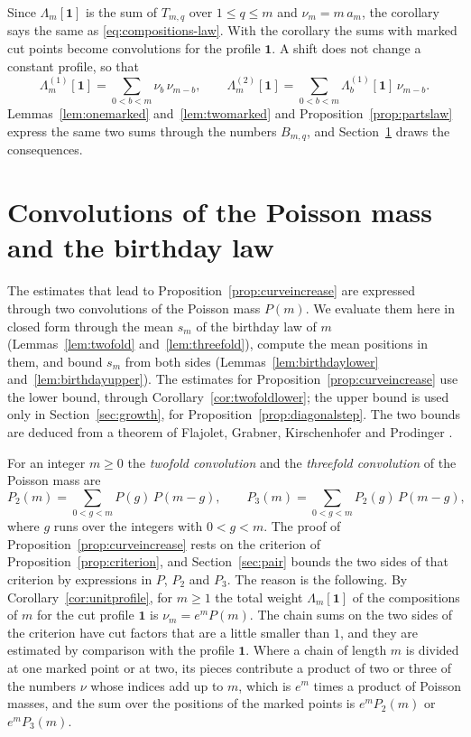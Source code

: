 \documentclass{amsart}
\theoremstyle{definition}
\theoremstyle{remark}
\numberwithin{equation}{section}
\begin{document}
Since $\Lambda_m[\mathbf 1]$ is the sum of $T_{m,q}$ over
$1\le q\le m$ and $\nu_m=m\,a_m$, the corollary says the same as
\eqref{eq:compositions-law}. With the
corollary the sums with marked cut points become convolutions for the
profile $\mathbf 1$. A shift does not change a constant profile, so that
\[
\Lambda^{(1)}_m[\mathbf 1]=\sum_{0<b<m}\nu_b\,\nu_{m-b},\qquad
\Lambda^{(2)}_m[\mathbf 1]=\sum_{0<b<m}\Lambda^{(1)}_b[\mathbf 1]\,\nu_{m-b}.
\]
Lemmas~\ref{lem:onemarked} and~\ref{lem:twomarked} and
Proposition~\ref{prop:partslaw} express the same two sums through the
numbers $B_{m,q}$, and Section~\ref{sec:birthday} draws the consequences.

\section{Convolutions of the Poisson mass and the birthday law}\label{sec:birthday}
The estimates that lead to Proposition~\ref{prop:curveincrease} are
expressed through two convolutions of the Poisson mass $P(m)$. We evaluate
them here in closed form through the mean $s_m$ of the birthday law of $m$
(Lemmas~\ref{lem:twofold} and~\ref{lem:threefold}), compute the mean
positions in them, and bound $s_m$ from both sides
(Lemmas~\ref{lem:birthdaylower} and~\ref{lem:birthdayupper}). The
estimates for Proposition~\ref{prop:curveincrease} use the lower bound,
through Corollary~\ref{cor:twofoldlower}; the upper bound is used only in
Section~\ref{sec:growth}, for
Proposition~\ref{prop:diagonalstep}. The two bounds are deduced from a
theorem of Flajolet, Grabner, Kirschenhofer and Prodinger
\cite[Theorem~7]{flajolet1995}.

For an integer $m\ge0$ the \emph{twofold convolution} and the
\emph{threefold convolution} of the Poisson mass are
\[
P_2(m)=\sum_{0<g<m}P(g)\,P(m-g),\qquad
P_3(m)=\sum_{0<g<m}P_2(g)\,P(m-g),
\]
where $g$ runs over the integers with $0<g<m$. The proof of
Proposition~\ref{prop:curveincrease} rests on the criterion of
Proposition~\ref{prop:criterion}, and Section~\ref{sec:pair} bounds the two
sides of that criterion by expressions in $P$, $P_2$ and $P_3$. The reason
is the following. By
Corollary~\ref{cor:unitprofile}, for $m\ge1$ the total weight
$\Lambda_m[\mathbf 1]$ of the compositions of $m$ for the cut profile
$\mathbf 1$ is $\nu_m=e^{m}P(m)$. The chain sums on the two sides of the
criterion have cut factors that are a little smaller than $1$, and they are
estimated by comparison with the profile $\mathbf 1$. Where a chain of
length $m$ is divided at one marked point or at two, its pieces contribute a
product of two or three of the numbers $\nu$ whose indices add up to $m$,
which is $e^{m}$ times a product of Poisson masses, and the sum over the
positions of the marked points is $e^{m}P_2(m)$ or $e^{m}P_3(m)$.
\end{document}
